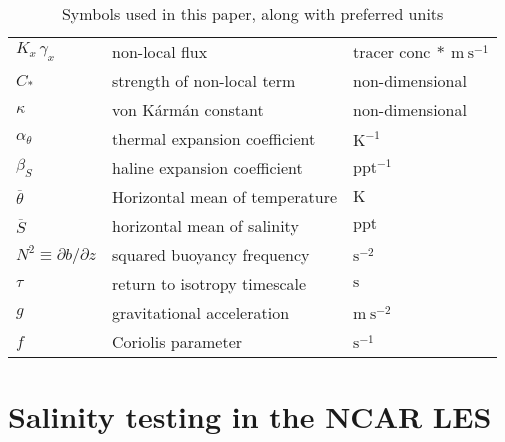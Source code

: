 \documentclass[preprint,12pt,authoryear]{agujournal}
\begin{document}
\begin{table}
\begin{tabular}{ l  p{7cm}  l }
	 $K_x \, \gamma_x$ & non-local flux & $\mbox{tracer conc}~*~\mbox{m}~\mbox{s}^{-1}$ \\
	 $C_*$ & strength of non-local term & non-dimensional \\
	 $\kappa$ & von K\'arm\'an constant & non-dimensional \\
	 $\alpha_{\theta}$ & thermal expansion coefficient & $\mbox{K}^{-1}$ \\
	 $\beta_S$ & haline expansion coefficient & $\mbox{ppt}^{-1}$ \\
	 $\overline{\theta}$ & Horizontal mean of temperature & $\mbox{K}$ \\
	 $\overline{S} $ & horizontal mean of salinity & $\mbox{ppt}$\\
	 $N^{2} \equiv \partial b/\partial z$ & squared buoyancy frequency 
     & $\mbox{s}^{-2}$ \\
	 $\tau$ & return to isotropy timescale & $\mbox{s}$\\
	 $g$ & gravitational acceleration & $\mbox{m}~\mbox{s}^{-2}$ \\
	 $f$ & Coriolis parameter & $\mbox{s}^{-1}$ \\
	  
	 \hline
	 
	 \end{tabular}
\caption{Symbols used in this paper, along with preferred units}
\label{symbol_table}
\end{table}

\section{Salinity testing in the NCAR LES}
\label{salinity:testing}
\end{document}
